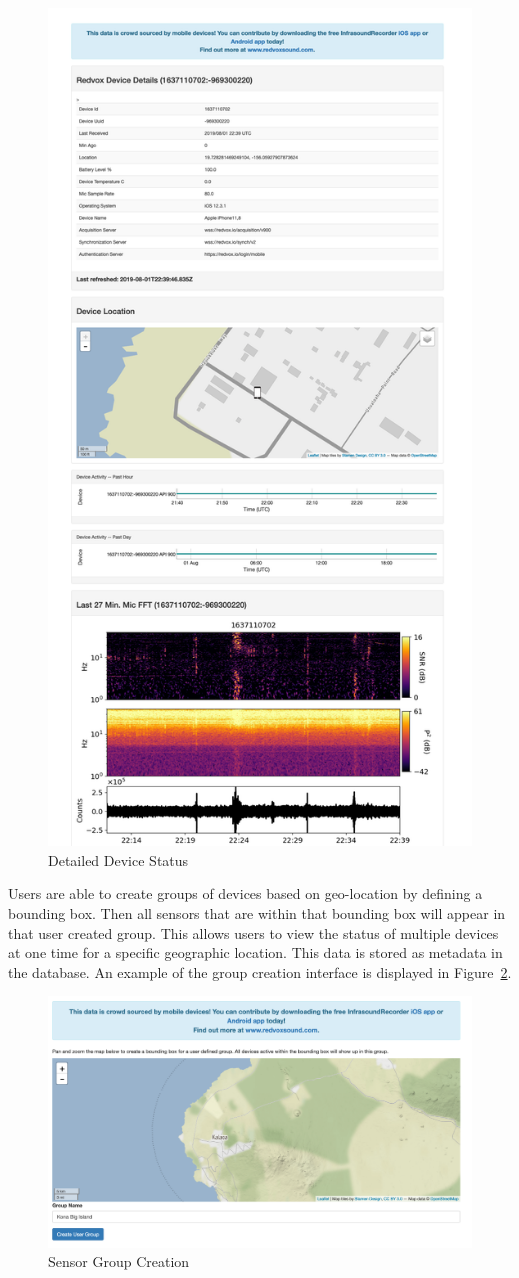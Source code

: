 \begin{figure}
	\centering
	\includegraphics[width=0.7\linewidth]{figures/lweb_detail.png}
	\caption{Detailed Device Status}
	\label{fig:lweb_detail}
\end{figure}

Users are able to create groups of devices based on geo-location by defining a bounding box. Then all sensors that are within that bounding box will appear in that user created group. This allows users to view the status of multiple devices at one time for a specific geographic location. This data is stored as metadata in the database. An example of the group creation interface is displayed in Figure~\ref{fig:lweb_groupcreate}.

\begin{figure}
	\centering
	\includegraphics[width=0.7\linewidth]{figures/lweb_groupcreate.png}
	\caption{Sensor Group Creation}
	\label{fig:lweb_groupcreate}
\end{figure}

